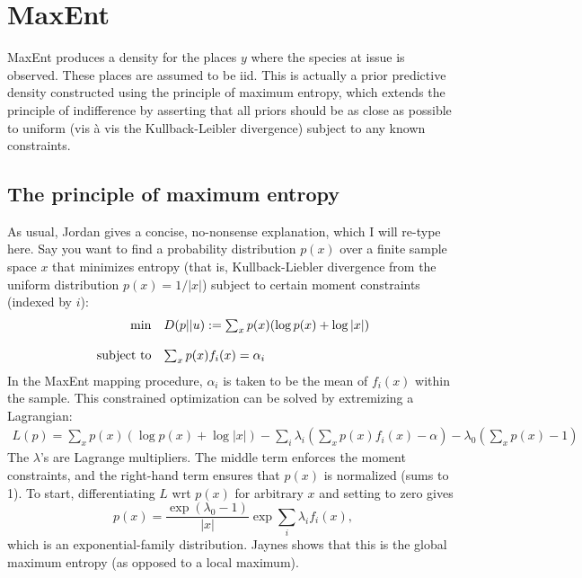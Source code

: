 
\section{MaxEnt} 
\label{sec:maxent}

MaxEnt produces a density for the places $y$ where the species at issue is observed. These places are assumed to be iid. This is actually a prior predictive density constructed using the principle of maximum entropy, which extends the principle of indifference by asserting that all priors should be as close as possible to uniform (vis \`a vis the Kullback-Leibler divergence) subject to any known constraints. 

\subsection{The principle of maximum entropy}

As usual, Jordan \cite{Jordan:ch19} gives a concise, no-nonsense explanation, which I will re-type here. Say you want to find a probability distribution $p(x)$ over a finite sample space $x$ that minimizes entropy (that is, Kullback-Liebler divergence from the uniform distribution $p(x)=1/|x|$) subject to certain moment constraints (indexed by $i$):
\begin{equation*}
    \begin{array}{rl}
        \min & D(p||u) := \sum_x p(x)(\log p(x) + \log |x|)\\\\
        \textup{subject to} & \sum_x p(x) f_i(x) = \alpha_i         
    \end{array}
\end{equation*}
In the MaxEnt mapping procedure, $\alpha_i$ is taken to be the mean of $f_i(x)$ within the sample. This constrained optimization can be solved by extremizing a Lagrangian:
\begin{eqnarray*}
    L(p) = \sum_x p(x)(\log p(x) + \log |x|) - \sum_i \lambda_i \left(\sum_x p(x)f_i(x)-\alpha \right) - \lambda_0 \left(\sum_x p(x)-1\right)
\end{eqnarray*}
The $\lambda$'s are Lagrange multipliers. The middle term enforces the moment constraints, and the right-hand term ensures that $p(x)$ is normalized (sums to 1). To start, differentiating $L$ wrt $p(x)$ for arbitrary $x$ and setting to zero gives
\begin{equation}
    \label{eq:exponential-family}
    p(x) = \frac{\exp{(\lambda_0-1)}}{|x|}\exp{\sum_i\lambda_if_i(x)},
\end{equation}
which is an exponential-family distribution. Jaynes \cite{Jaynes:ch11} shows that this is the global maximum entropy (as opposed to a local maximum).

